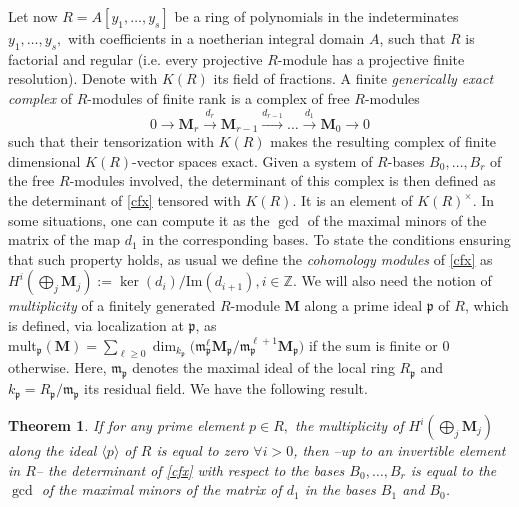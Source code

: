 \documentclass[a4paper,11pt]{amsart}
\newcommand{\Z}{\mathbb{Z}}
\newcounter{thm}
\numberwithin{thm}{section}
\numberwithin{equation}{section}
\theoremstyle{definition}
\theoremstyle{plain}
\newtheorem{theorem}[thm]{Theorem}
\begin{document}
Let now $R=A[y_1,\ldots, y_s]$ be a ring of polynomials in the indeterminates $y_1,\ldots, y_s,$ with coefficients in a noetherian integral domain $A$, such that $R$ is factorial and regular (i.e. every projective $R$-module has a projective finite resolution). Denote with $K(R)$ its field of fractions.  A finite {\em generically exact complex} of $R$-modules of finite rank is a complex of free $R$-modules
\begin{equation}\label{cfx}
0\to \mathbf{M}_r\stackrel{d_r}{\to} \mathbf{M}_{r-1}\stackrel{d_{r-1}}{\to}\ldots\stackrel{d_1}{\to} \mathbf{M}_0\to0
\end{equation}
such that their tensorization with $K(R)$ makes the resulting complex of finite dimensional $K(R)$-vector spaces exact. Given a system of $R$-bases $B_0,\dots, B_r$ of the free $R$-modules involved, the determinant of this complex is then defined as the determinant of  \eqref{cfx} tensored with $K(R).$  It is an element of $K(R)^\times.$
In some situations, one can compute it as the $\gcd$ of the maximal minors of the matrix of the map $d_1$ in the corresponding bases. To state the conditions ensuring that such property holds,
as usual we define the {\em cohomology modules} of  \eqref{cfx} as $H^i(\bigoplus_j \mathbf{M}_j):=\ker(d_{i})/ \mbox{Im}(d_{i+1}), i\in\Z$.
We will also need the notion of \emph{multiplicity} of a finitely generated $R$-module $\mathbf{M}$ along a prime ideal $\mathfrak{p}$ of $R$, which is defined, via localization at $\mathfrak{p}$, as $\mbox{mult}_{\mathfrak{p}}(\mathbf{M}) = \sum_{\ell\ge 0}
\dim_{k_\mathfrak{p}} \big(\mathfrak{m}_{\mathfrak{p}}^\ell \mathbf{M}_\mathfrak{p}/\mathfrak{m}_{\mathfrak{p}}^{\ell+1} \mathbf{M}_\mathfrak{p}\big)$ if the sum is finite or $0$ otherwise. Here, $\mathfrak{m}_\mathfrak{p}$ denotes the maximal ideal of the local ring $R_\mathfrak{p}$ and $k_\mathfrak{p}= R_{\mathfrak{p}}/\mathfrak{m}_\mathfrak{p}$ its residual field.
We have the following result.

\begin{theorem}\cite[Theorem $34$, Appendix A]{GKZ94}\label{mult}
If for any prime element $p\in R,$  the multiplicity of $H^i(\bigoplus_j \mathbf{M}_j)$ along the ideal $\langle p\rangle$ of $R$ is equal to zero $\forall i>0$, then --up to an invertible element in $R$--  the determinant of \eqref{cfx} with respect to the bases $B_0,\ldots, B_r$ is equal to the $\gcd$ of the maximal minors of the matrix of $d_1$ in the bases $B_1$ and $B_0$.
\end{theorem}
\end{document}

